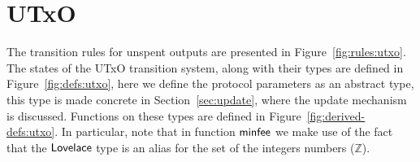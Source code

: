 \newcommand{\PPMMap}{\ensuremath{\type{PParams}}}
\newcommand{\Lmax}{\ensuremath{\mathbb{L}_{\var{max}}}}
\section{UTxO}
\label{sec:state-trans-utxo-1}

The transition rules for unspent outputs are presented in
Figure~\ref{fig:rules:utxo}. The states of the UTxO transition system, along
with their types are defined in Figure~\ref{fig:defs:utxo}, here we define the
protocol parameters as an abstract type, this type is made concrete in
Section~\ref{sec:update}, where the update mechanism is discussed. Functions on
these types are defined in Figure~\ref{fig:derived-defs:utxo}. In particular,
note that in function $\mathsf{minfee}$ we make use of the fact that the
$\mathsf{Lovelace}$ type is an alias for the set of the integers numbers
($\mathbb{Z}$).

